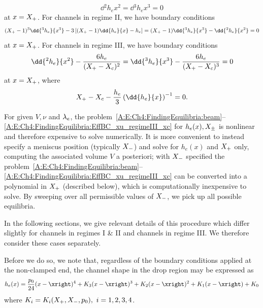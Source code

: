 \begin{subappendices}
\begin{equation}
\dd{^2 h_e}{x^2}  = \dd{^3 h_e}{x^3} =0
\end{equation}
at $x = X_{+}$. For channels in regime II, we have boundary conditions
\begin{equation}\label{A:E:Ch4:FindingEquilibria:EffBC_xu_regimeII}
(\xrighteq - 1)^3\dd{^3 h_e}{x^3}  - 3\left[(\xrighteq - 1)\dd{h_e}{x} - h_e\right] =
(\xrighteq - 1)\dd{^3 h_e}{x^3}  -\dd{^2 h_e}{x^2} = 0
\end{equation}
at $x = X_{+}$. For channels in regime III, we have boundary conditions
\begin{equation}\label{A:E:Ch4:FindingEquilibria:EffBC_xu_regimeIII}
\dd{^2 h_e}{x^2} - \frac{6h_e}{(\xrighteq - \xceq)^2} = \dd{^3 h_e}{x^3} - \frac{6h_e}{(\xrighteq - \xceq)^3}=0
\end{equation}
at $x = X_{+}$, where
\begin{equation}\label{A:E:Ch4:FindingEquilibria:EffBC_xu_regimeIII_xc}
\xrighteq - \xceq - \frac{h_e}{3}\left(\dd{h_e}{x}\right)^{-1}=0.
\end{equation}

For  given $V, \nu$ and $\lambda_e$, the problem~\eqref{A:E:Ch4:FindingEquilibria:beam}--\eqref{A:E:Ch4:FindingEquilibria:EffBC_xu_regimeIII_xc} for $h_e(x), X_{\pm}$ is nonlinear and therefore expensive to solve numerically. It is more convenient to instead specify a meniscus position (typically $X_{-}$) and solve for $h_e(x)$ and $X_{+}$ only,  computing the associated volume $V$ a posteriori; with $X_{-}$ specified the problem~\eqref{A:E:Ch4:FindingEquilibria:beam}--\eqref{A:E:Ch4:FindingEquilibria:EffBC_xu_regimeIII_xc} can be converted into a polynomial in $X_{+}$ (described below), which is computationally inexpensive to solve.  By sweeping over all permissible values of $X_{-}$, we pick up all possible equilibria.

In the following sections, we give relevant details of this procedure which differ slightly for channels in regimes I \& II and channels in regime III. We therefore consider these cases separately.

Before we do so, we note that, regardless of the boundary conditions applied at the non-clamped end, the channel shape in the drop region may be expressed as
\begin{equation}\label{A:E:Ch4:FindingEquilibria:Shape}
h_e(x) = \frac{p_0}{24}(x - \xright)^4 + K_3 (x- \xright)^3 + K_2 (x- \xright)^2 + K_1 (x- \xright) + K_0
\end{equation}
where $K_i = K_i(X_{+}, X_{-}, p_0),~ i = 1,2,3,4$.

\end{subappendices}

